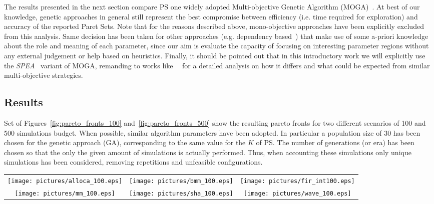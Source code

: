 The results presented in the next section compare PS one widely
adopted Multi-objective Genetic Algorithm
(MOGA)~\cite{knowles_techrep06}. At best of our knowledge, genetic
approaches in general still represent the best compromise between
efficiency (i.e. time required for exploration) and accuracy of the
reported Paret Sets.  Note that for the reasons described above,
mono-objective approaches have been explicitly excluded from this
analysis. Same decision has been taken for other approaches (e.g.
dependency based~\cite{givargis_tvlsi02}) that make use of some
a-priori knowledge about the role and meaning of each parameter, since
our aim is evaluate the capacity of focusing on interesting parameter
regions without any external judgement or help based on heuristics.
Finally, it should be pointed out that in this introductory work we
will explicitly use the \emph{SPEA}~\cite{zitzler_eurogen01} variant of MOGA,
remanding to works like~\cite{zitzler_ec00}~\cite{zitzler_tec03} for a
detailed analysis on how it differs and what could be expected from
similar multi-objective strategies.


\subsection{Results}

Set of Figures~\ref{fig:pareto_fronts_100}
and~\ref{fig:pareto_fronts_500} show the resulting pareto fronts for two
different scenarios of 100 and 500 simulations budget. When possible,
similar algorithm parameters have been adopted. In particular a
population size of 30 has been chosen for the genetic approach (GA), corresponding to the
same value for the $K$ of PS. The number of generations (or era)
has been chosen so that the only the given amount of simulations is
actually performed. Thus, when accounting these simulations only unique simulations
has been considered, removing repetitions and unfeasible
configurations.

\begin{table*}
  \centering
  \begin{tabular}{ccc}
    \texttt{[image: pictures/alloca\_100.eps]} &
    \texttt{[image: pictures/bmm\_100.eps]} & 
    \texttt{[image: pictures/fir\_int100.eps]} \\
    \texttt{[image: pictures/mm\_100.eps]} &
    \texttt{[image: pictures/sha\_100.eps]} &
    \texttt{[image: pictures/wave\_100.eps]} 
  \end{tabular}
  \caption{Pareto fronts found by PS and GA for a fixed budget of 100 configurations.}
  \label{fig:pareto_fronts_100}
\end{table*}

